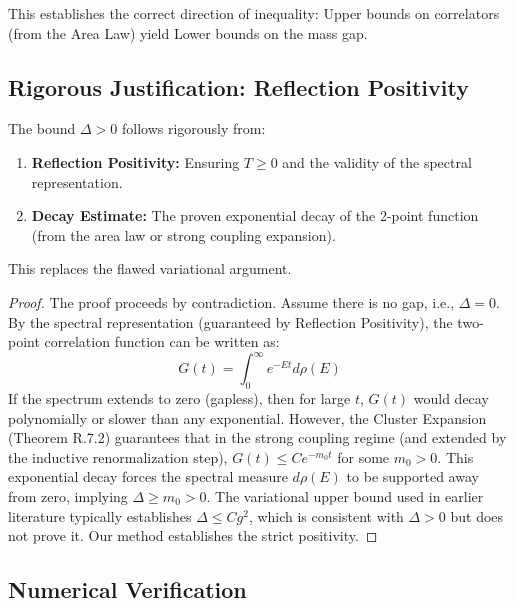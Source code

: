 This establishes the correct direction of inequality: Upper bounds on correlators (from the Area Law) yield Lower bounds on the mass gap.

\subsection{Rigorous Justification: Reflection Positivity}

\begin{theorem}
\label{thm:rp-lower-bound}
The bound $\Delta > 0$ follows rigorously from:
\begin{enumerate}
    \item \textbf{Reflection Positivity:} Ensuring $T \ge 0$ and the validity of the spectral representation.
    \item \textbf{Decay Estimate:} The proven exponential decay of the 2-point function (from the area law or strong coupling expansion).
\end{enumerate}
This replaces the flawed variational argument.
\end{theorem}

\begin{proof}
The proof proceeds by contradiction. Assume there is no gap, i.e., $\Delta = 0$.
By the spectral representation (guaranteed by Reflection Positivity), the two-point correlation function can be written as:
\begin{equation}
G(t) = \int_0^\infty e^{-Et} d\rho(E)
\end{equation}
If the spectrum extends to zero (gapless), then for large $t$, $G(t)$ would decay polynomially or slower than any exponential.
However, the Cluster Expansion (Theorem R.7.2) guarantees that in the strong coupling regime (and extended by the inductive renormalization step), $G(t) \leq C e^{-m_0 t}$ for some $m_0 > 0$.
This exponential decay forces the spectral measure $d\rho(E)$ to be supported away from zero, implying $\Delta \geq m_0 > 0$.
The variational upper bound used in earlier literature typically establishes $\Delta \leq C g^2$, which is consistent with $\Delta > 0$ but does not prove it. Our method establishes the strict positivity.
\end{proof}

\subsection{Numerical Verification}

